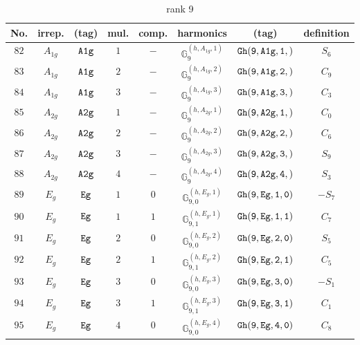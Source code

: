\documentclass[fleqn,8pt]{jsarticle}
\begin{document}
\begin{table}[ht!]
\begin{center}
\caption{rank 9}
\renewcommand{\arraystretch}{1.3}
\begin{tabular}{cccccccc} \hline \hline
No. & irrep. & (tag) & mul. & comp. & harmonics & (tag) & definition \\ \hline
$ 82 $ & $ A_{1g} $ & $ {\tt A1g} $ & $ 1 $ & $ - $ & $ \mathbb{G}_{9}^{(h,A_{1g},1)} $ & $ {\tt Gh(9,A1g,1,)} $ & $ S_{6} $ \\
$ 83 $ & $ A_{1g} $ & $ {\tt A1g} $ & $ 2 $ & $ - $ & $ \mathbb{G}_{9}^{(h,A_{1g},2)} $ & $ {\tt Gh(9,A1g,2,)} $ & $ C_{9} $ \\
$ 84 $ & $ A_{1g} $ & $ {\tt A1g} $ & $ 3 $ & $ - $ & $ \mathbb{G}_{9}^{(h,A_{1g},3)} $ & $ {\tt Gh(9,A1g,3,)} $ & $ C_{3} $ \\
$ 85 $ & $ A_{2g} $ & $ {\tt A2g} $ & $ 1 $ & $ - $ & $ \mathbb{G}_{9}^{(h,A_{2g},1)} $ & $ {\tt Gh(9,A2g,1,)} $ & $ C_{0} $ \\
$ 86 $ & $ A_{2g} $ & $ {\tt A2g} $ & $ 2 $ & $ - $ & $ \mathbb{G}_{9}^{(h,A_{2g},2)} $ & $ {\tt Gh(9,A2g,2,)} $ & $ C_{6} $ \\
$ 87 $ & $ A_{2g} $ & $ {\tt A2g} $ & $ 3 $ & $ - $ & $ \mathbb{G}_{9}^{(h,A_{2g},3)} $ & $ {\tt Gh(9,A2g,3,)} $ & $ S_{9} $ \\
$ 88 $ & $ A_{2g} $ & $ {\tt A2g} $ & $ 4 $ & $ - $ & $ \mathbb{G}_{9}^{(h,A_{2g},4)} $ & $ {\tt Gh(9,A2g,4,)} $ & $ S_{3} $ \\
$ 89 $ & $ E_{g} $ & $ {\tt Eg} $ & $ 1 $ & $ 0 $ & $ \mathbb{G}_{9,0}^{(h,E_{g},1)} $ & $ {\tt Gh(9,Eg,1,0)} $ & $ - S_{7} $ \\
$ 90 $ & $ E_{g} $ & $ {\tt Eg} $ & $ 1 $ & $ 1 $ & $ \mathbb{G}_{9,1}^{(h,E_{g},1)} $ & $ {\tt Gh(9,Eg,1,1)} $ & $ C_{7} $ \\
$ 91 $ & $ E_{g} $ & $ {\tt Eg} $ & $ 2 $ & $ 0 $ & $ \mathbb{G}_{9,0}^{(h,E_{g},2)} $ & $ {\tt Gh(9,Eg,2,0)} $ & $ S_{5} $ \\
$ 92 $ & $ E_{g} $ & $ {\tt Eg} $ & $ 2 $ & $ 1 $ & $ \mathbb{G}_{9,1}^{(h,E_{g},2)} $ & $ {\tt Gh(9,Eg,2,1)} $ & $ C_{5} $ \\
$ 93 $ & $ E_{g} $ & $ {\tt Eg} $ & $ 3 $ & $ 0 $ & $ \mathbb{G}_{9,0}^{(h,E_{g},3)} $ & $ {\tt Gh(9,Eg,3,0)} $ & $ - S_{1} $ \\
$ 94 $ & $ E_{g} $ & $ {\tt Eg} $ & $ 3 $ & $ 1 $ & $ \mathbb{G}_{9,1}^{(h,E_{g},3)} $ & $ {\tt Gh(9,Eg,3,1)} $ & $ C_{1} $ \\
$ 95 $ & $ E_{g} $ & $ {\tt Eg} $ & $ 4 $ & $ 0 $ & $ \mathbb{G}_{9,0}^{(h,E_{g},4)} $ & $ {\tt Gh(9,Eg,4,0)} $ & $ C_{8} $ \\

\end{tabular}
\end{center}
\end{table}
\end{document}
